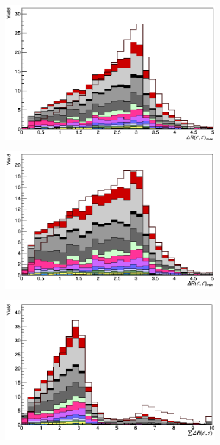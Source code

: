 \begin{figure}[H]
\begin{subfigure}{.5\textwidth}
\end{subfigure}%
\begin{subfigure}{.5\textwidth}
  \centering
  \includegraphics[width=.99\linewidth]{figs/features/deltaR_ll_max}
\end{subfigure}
\begin{subfigure}{.5\textwidth}
  \centering
  \includegraphics[width=.99\linewidth]{figs/features/deltaR_ll_min}
\end{subfigure}
\begin{subfigure}{.5\textwidth}
  \centering
  \includegraphics[width=.99\linewidth]{figs/features/deltaR_ll_sum}

\end{subfigure}
\end{figure}
